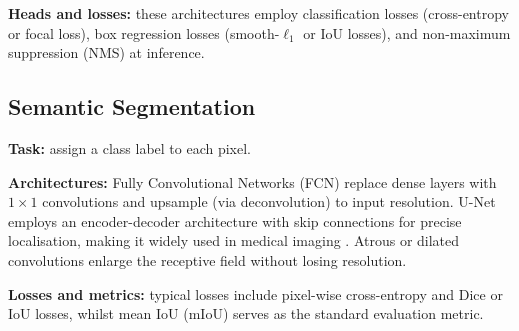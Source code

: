 \textbf{Heads and losses:} these architectures employ classification losses (cross-entropy or focal loss), box regression losses (smooth-$\ell_1$ or IoU losses), and non-maximum suppression (NMS) at inference.

\subsection{Semantic Segmentation}

\textbf{Task:} assign a class label to each pixel.

\textbf{Architectures:} Fully Convolutional Networks (FCN) replace dense layers with $1\times1$ convolutions and upsample (via deconvolution) to input resolution. U-Net employs an encoder-decoder architecture with skip connections for precise localisation, making it widely used in medical imaging \cite{Ronneberger2015}. Atrous or dilated convolutions enlarge the receptive field without losing resolution.

\textbf{Losses and metrics:} typical losses include pixel-wise cross-entropy and Dice or IoU losses, whilst mean IoU (mIoU) serves as the standard evaluation metric.
